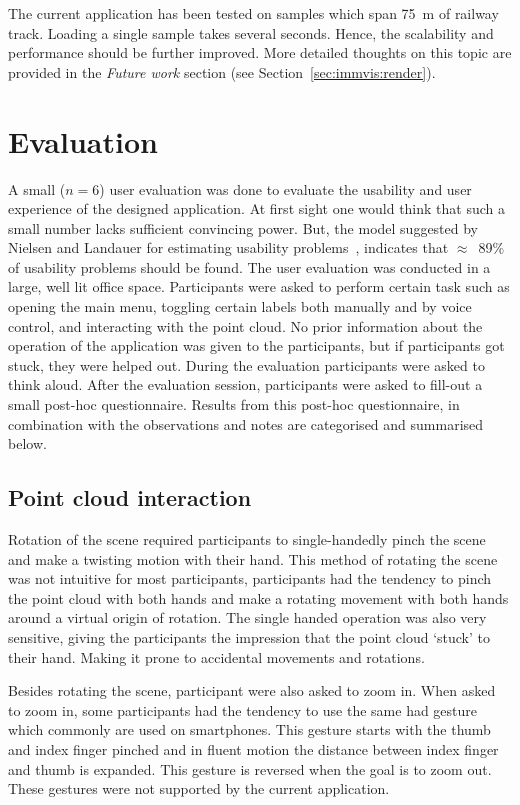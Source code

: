 The current application has been tested on samples which span 75~m of railway track. Loading a single sample takes several seconds. Hence, the scalability and performance should be further improved. More detailed thoughts on this topic are provided in the \emph{Future work} section (see Section~\ref{sec:immvis:render}).

\section{Evaluation}
A small (\(n=6\)) user evaluation was done to evaluate the usability and user experience of the designed application. At first sight one would think that such a small number lacks sufficient convincing power. But, the model suggested by Nielsen and Landauer for estimating usability problems~\cite{Nielsen1993}, indicates that $\approx$~89\% of usability problems should be found. The user evaluation was conducted in a large, well lit office space. Participants were asked to perform certain task such as opening the main menu, toggling certain labels both manually and by voice control, and interacting with the point cloud. No prior information about the operation of the application was given to the participants, but if participants got stuck, they were helped out. During the evaluation participants were asked to think aloud. After the evaluation session, participants were asked to fill-out a small post-hoc questionnaire. Results from this post-hoc questionnaire, in combination with the observations and notes are categorised and summarised below.

\subsection{Point cloud interaction}
Rotation of the scene required participants to single-handedly pinch the scene and make a twisting motion with their hand. This method of rotating the scene was not intuitive for most participants, participants had the tendency to pinch the point cloud with both hands and make a rotating movement with both hands around a virtual origin of rotation. The single handed operation was also very sensitive, giving the participants the impression that the point cloud `stuck' to their hand. Making it prone to accidental movements and rotations.

Besides rotating the scene, participant were also asked to zoom in. When asked to zoom in, some participants had the tendency to use the same had gesture which commonly are used on smartphones. This gesture starts with the thumb and index finger pinched and in fluent motion the distance between index finger and thumb is expanded. This gesture is reversed when the goal is to zoom out. These gestures were not supported by the current application.


